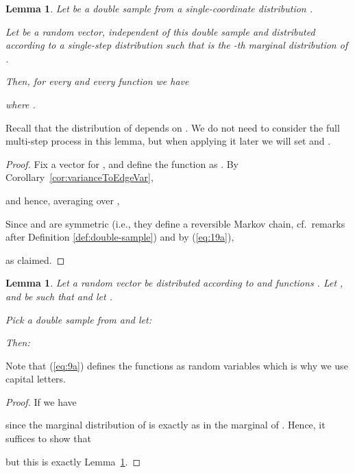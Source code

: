 \documentclass{daj}
\newcommand{\1}{\mathbbm{1}}
\theoremstyle{plain}
\newtheorem{lemma}[theorem]{Lemma}
\theoremstyle{definition}
\begin{document}
\begin{lemma}\label{lem:fjNormIncrease}
Let  be a double sample from a
single-coordinate distribution .

Let  be a random vector, independent of this double sample
and distributed according to a single-step
distribution  such that
 is the -th marginal distribution of .

Then, for every  and every function 
 we have

where .
\end{lemma}
Recall that the distribution of  depends on .
We do not need to
consider the full multi-step process in this lemma, but when applying it later
we will set  and .

\begin{proof}
Fix a vector  for 
,
and define the function  as
.
By Corollary~\ref{cor:varianceToEdgeVar},

and hence, averaging over ,


Since  and  are symmetric (i.e., they define a reversible Markov chain,
cf.~remarks after Definition \ref{def:double-sample}) and by (\ref{eq:19a}),

as claimed.
\end{proof}

\begin{lemma}\label{lem:averageNormIncrease}
Let a random vector  be distributed according to
 and functions
.
Let ,  and  be such that
 and let .

Pick a double sample  from  and let:

Then:

\end{lemma}
Note that (\ref{eq:9a}) defines the functions  as random variables
which is why we use capital letters.
\begin{proof}
If  we have

since the marginal distribution of  is exactly as in the 
marginal  of .
Hence, it suffices to show that

but this is exactly Lemma~\ref{lem:fjNormIncrease}.
\end{proof}
\end{document}
